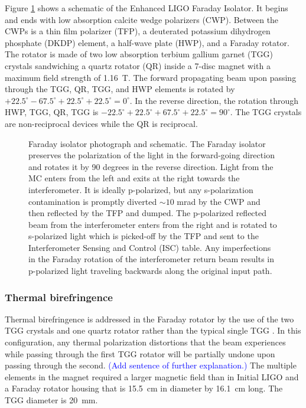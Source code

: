 Figure \ref{fig:FI} shows a schematic of the Enhanced LIGO Faraday
Isolator. It begins and ends with low absorption calcite wedge
polarizers (CWP). Between the CWPs is a thin film polarizer (TFP), a
deuterated potassium dihydrogen phosphate (DKDP) element, a half-wave
plate (HWP), and a Faraday rotator. The rotator is made of two low
absorption terbium gallium garnet (TGG) crystals sandwiching a quartz
rotator (QR) inside a 7-disc magnet with a maximum field strength of
1.16~T. The forward propagating beam upon passing through the TGG, QR,
TGG, and HWP elements is rotated by $+22.5^\circ - 67.5^\circ +
22.5^\circ + 22.5^\circ = 0^\circ$. In the reverse direction, the
rotation through HWP, TGG, QR, TGG is $-22.5^\circ + 22.5^\circ +
67.5^\circ + 22.5^\circ = 90^\circ$. The TGG crystals are
non-reciprocal devices while the QR is reciprocal.

\begin{figure}
\begin{centering}
\caption[Faraday isolator photograph and schematic.]{Faraday isolator
  photograph and schematic. The Faraday isolator preserves the
  polarization of the light in the forward-going direction and rotates
  it by 90 degrees in the reverse direction. Light from the MC enters
  from the left and exits at the right towards the interferometer. It
  is ideally p-polarized, but any s-polarization contamination is
  promptly diverted $\sim 10$ mrad by the CWP and then reflected by
  the TFP and dumped. The p-polarized reflected beam from the
  interferometer enters from the right and is rotated to s-polarized
  light which is picked-off by the TFP and sent to the Interferometer
  Sensing and Control (ISC) table. Any imperfections in the Faraday
  rotation of the interferometer return beam results in p-polarized
  light traveling backwards along the original input path.}
\label{fig:FI}
\end{centering}
\end{figure}

\subsubsection{Thermal birefringence} 
Thermal birefringence is addressed in the Faraday rotator by the use
of the two TGG crystals and one quartz rotator rather than the typical
single TGG \citep{Khazanov2000Suppression}.  In this configuration, any
thermal polarization distortions that the beam experiences while
passing through the first TGG rotator will be partially undone upon
passing through the second. \textcolor{blue}{(Add sentence of further
  explanation.)} The multiple elements in the magnet required a larger
magnetic field than in Initial LIGO and a Faraday rotator housing that
is 15.5~cm in diameter by 16.1~cm long. The TGG diameter is 20~mm.

